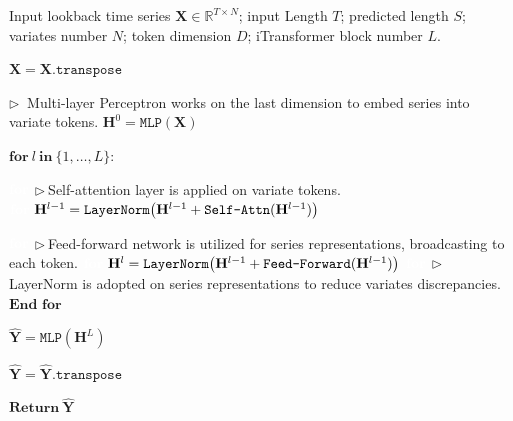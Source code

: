 \documentclass{article} %
\begin{document}
\begin{algorithm}[htbp]
  \caption{iTransformer - Overall Architecture.}\label{algo:iTransformer}
  \begin{algorithmic}[1]
  \Require  
  Input lookback time series $\mathbf{X}\in\mathbb{R}^{T\times N}$; input Length $T$; predicted length $S$; variates number $N$; token dimension $D$; iTransformer block number $L$.

    \State $\mathbf{X}=\mathbf{X}.\texttt{transpose}$ 

    \State $\triangleright \ $ Multi-layer Perceptron works on the last dimension to embed series into variate tokens.
    \State $\mathbf{H}^{0}=\texttt{MLP}(\mathbf{X})$ 

    \State $\textbf{for}\ l\ \textbf{in}\ \{1,\dots,L\}\textbf{:}$

    \State $\textbf{\textcolor{white}{for}}$ $\triangleright \ $Self-attention layer is applied on variate tokens.
    \State $\textbf{\textcolor{white}{for}}\ \mathbf{H}^{l-1} = \texttt{LayerNorm}\big(\mathbf{H}^{l-1} + \texttt{Self-Attn}(\mathbf{H}^{l-1})\big)$
    
     \State $\textbf{\textcolor{white}{for}}$ $\triangleright \ $Feed-forward network is utilized for series representations, broadcasting to each token.
    \State $\textbf{\textcolor{white}{for}}\ \mathbf{H}^{l} = \texttt{LayerNorm}\big(\mathbf{H}^{l-1} + \texttt{Feed-Forward}(\mathbf{H}^{l-1})\big)$
    \State $\textbf{\textcolor{white}{for}}$ $\triangleright \ $ LayerNorm is adopted on series representations to reduce variates discrepancies.
    \State $\textbf{End for}$

    \State $\mathbf{\hat{Y}}=\texttt{MLP}(\mathbf{H}^{L})$ 

    \State $\mathbf{\hat{Y}}=\mathbf{\hat{Y}}.\texttt{transpose}$ 
    
    \State $\textbf{Return}\ \mathbf{\hat{Y}}$ 
  \end{algorithmic} 
\end{algorithm} 
\end{document}
